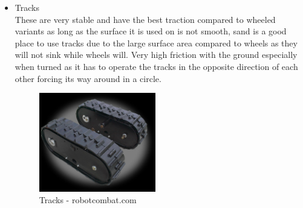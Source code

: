 \begin{itemize}
\item Tracks
\\These are very stable and have the best traction compared to wheeled variants as long as the surface it is used on is not smooth, sand is a good place to use tracks due to the large surface area compared to wheels as they will not sink while wheels will.  Very high friction with the ground especially when turned as it has to operate the tracks in the opposite direction of each other forcing its way around in a circle.
\begin{figure}[h]
\centering
        \includegraphics[width=2.0in] {Images/wheel-track.jpg}
        \caption{Tracks - robotcombat.com}
        \label{Tracks}
\end{figure}



\end{itemize}

